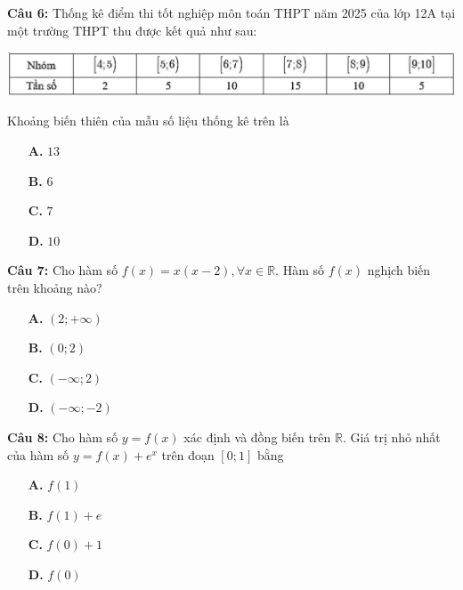 \documentclass[12pt, a4paper]{article}
\begin{document}
\textbf{Câu 6: } Thống kê điểm thi tốt nghiệp môn toán THPT năm 2025 của lớp 12A tại một trường THPT thu được kết quả như sau:
\vspace{-0.4cm}
	\begin{center}
		\includegraphics[scale=0.85]{../assets/3.png}
	\end{center}
\vspace{-0.7cm}
	Khoảng biến thiên của mẫu số liệu thống kê trên là
	\begin{multicols}{4}
		\begin{enumerate}
			\item[\textbf{A.}] $ 13 $
			\item[\textbf{B.}] $ 6 $
			\item[\textbf{C.}] $ 7 $
			\item[\textbf{D.}] $ 10 $
		\end{enumerate}
	\end{multicols}

\textbf{Câu 7: } Cho hàm số $ f(x) = x(x - 2) , \forall x \in \mathbb{R} $. Hàm số $ f(x) $ nghịch biến trên khoảng nào?
	\begin{multicols}{4}
		\begin{enumerate}
			\item[\textbf{A.}] $ (2; +\infty) $
			\item[\textbf{B.}] $ (0; 2) $
			\item[\textbf{C.}] $ (-\infty; 2) $
			\item[\textbf{D.}] $ (-\infty; -2)$
		\end{enumerate}
	\end{multicols}
	
\textbf{Câu 8: } Cho hàm số $ y = f(x) $ xác định và đồng biến trên $ \mathbb{R} $. Giá trị nhỏ nhất của hàm số $ y = f(x) + e^x $ trên đoạn $ [0;1] $ bằng
	\begin{multicols}{4}
		\begin{enumerate}
			\item[\textbf{A.}] $ f(1) $
			\item[\textbf{B.}] $ f(1) + e $
			\item[\textbf{C.}] $ f(0) + 1 $
			\item[\textbf{D.}] $ f(0) $
		\end{enumerate}
	\end{multicols}
	
\end{document}

